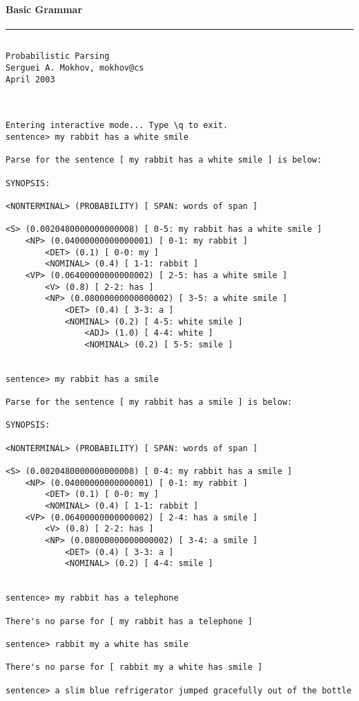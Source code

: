 \paragraph{Basic Grammar}

\tiny
\hrule\vskip4pt
\begin{verbatim}

Probabilistic Parsing
Serguei A. Mokhov, mokhov@cs
April 2003



Entering interactive mode... Type \q to exit.
sentence> my rabbit has a white smile

Parse for the sentence [ my rabbit has a white smile ] is below:

SYNOPSIS:

<NONTERMINAL> (PROBABILITY) [ SPAN: words of span ]

<S> (0.0020480000000000008) [ 0-5: my rabbit has a white smile ]
    <NP> (0.04000000000000001) [ 0-1: my rabbit ]
        <DET> (0.1) [ 0-0: my ]
        <NOMINAL> (0.4) [ 1-1: rabbit ]
    <VP> (0.06400000000000002) [ 2-5: has a white smile ]
        <V> (0.8) [ 2-2: has ]
        <NP> (0.08000000000000002) [ 3-5: a white smile ]
            <DET> (0.4) [ 3-3: a ]
            <NOMINAL> (0.2) [ 4-5: white smile ]
                <ADJ> (1.0) [ 4-4: white ]
                <NOMINAL> (0.2) [ 5-5: smile ]


sentence> my rabbit has a smile

Parse for the sentence [ my rabbit has a smile ] is below:

SYNOPSIS:

<NONTERMINAL> (PROBABILITY) [ SPAN: words of span ]

<S> (0.0020480000000000008) [ 0-4: my rabbit has a smile ]
    <NP> (0.04000000000000001) [ 0-1: my rabbit ]
        <DET> (0.1) [ 0-0: my ]
        <NOMINAL> (0.4) [ 1-1: rabbit ]
    <VP> (0.06400000000000002) [ 2-4: has a smile ]
        <V> (0.8) [ 2-2: has ]
        <NP> (0.08000000000000002) [ 3-4: a smile ]
            <DET> (0.4) [ 3-3: a ]
            <NOMINAL> (0.2) [ 4-4: smile ]


sentence> my rabbit has a telephone

There's no parse for [ my rabbit has a telephone ]

sentence> rabbit my a white has smile

There's no parse for [ rabbit my a white has smile ]

sentence> a slim blue refrigerator jumped gracefully out of the bottle


\end{verbatim}
